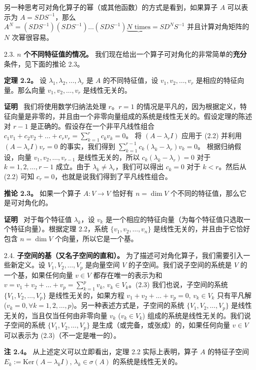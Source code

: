 另一种思考可对角化算子的幂（或其他函数）的方式是看到，如果算子 $A$ 可以表示为 $A = SDS^{-1}$，那么
$A^N = (SDS^{-1})(SDS^{-1})\dots(SDS^{-1}) \underbrace{N \text{ times}} = SD^N S^{-1}$
并且计算对角矩阵的 $N$ 次幂很容易。

2.3. \textbf{$n$ 个不同特征值的情况。} 我们现在给出一个算子可对角化的非常简单的\textbf{充分}条件，见下面的推论 2.3。

\textbf{定理 2.2。} 设 $\lambda_1, \lambda_2, \dots, \lambda_r$ 是 $A$ 的不同特征值，设 $v_1, v_2, \dots, v_r$ 是相应的特征向量。那么向量 $v_1, v_2, \dots, v_r$ 是线性无关的。

\textbf{证明}~ 我们将使用数学归纳法处理 $r$。$r=1$ 的情况是平凡的，因为根据定义，特征向量是非零的，并且由一个非零向量组成的系统是线性无关的。假设定理的陈述对 $r-1$ 是正确的。假设存在一个非平凡线性组合
$c_1 v_1 + c_2 v_2 + \dots + c_r v_r = \sum_{k=1}^r c_k v_k = 0$。
将 $(A - \lambda_r I)$ 应用于 (2.2) 并利用 $(A - \lambda_r I)v_r = 0$ 的事实，我们得到
$\sum_{k=1}^{r-1} c_k (\lambda_k - \lambda_r) v_k = 0$。
根据归纳假设，向量 $v_1, v_2, \dots, v_{r-1}$ 是线性无关的，所以 $c_k(\lambda_k - \lambda_r) = 0$ 对于 $k=1, 2, \dots, r-1$ 成立。由于 $\lambda_k \neq \lambda_r$，我们可以得出 $c_k = 0$ 对于 $k < r$。然后从 (2.2) 可知 $c_r = 0$，也就是说我们得到了平凡线性组合。

\textbf{推论 2.3。} 如果一个算子 $A: V \to V$ 恰好有 $n = \dim V$ 个不同的特征值，那么它是可对角化的。

\textbf{证明}~ 对于每个特征值 $\lambda_k$，设 $v_k$ 是一个相应的特征向量（为每个特征值只选取一个特征向量）。根据定理 2.2，系统 $\{v_1, v_2, \dots, v_n\}$ 是线性无关的，并且由于它恰好包含 $n = \dim V$ 个向量，所以它是一个基。



2.4. \textbf{子空间的基（又名子空间的直和）。} 为了描述可对角化算子，我们需要引入一些新定义。设 $V_1, V_2, \dots, V_p$ 是向量空间 $V$ 的子空间。我们说子空间的系统是 $V$ 的一个基，如果任何向量 $v \in V$ 都存在唯一的表示为和
$v = v_1 + v_2 + \dots + v_p = \sum_{k=1}^p v_k$, $v_k \in V_k$。(2.3)
我们也说，子空间的系统 $\{V_1, V_2, \dots, V_p\}$ 是线性无关的，如果方程 $v_1 + v_2 + \dots + v_p = 0$, $v_k \in V_k$ 只有平凡解 ($v_k = 0, \forall k = 1, 2, \dots, p$)。另一种表述方式是，子空间的系统 $\{V_1, V_2, \dots, V_p\}$ 是线性无关的，当且仅当任何由非零向量 $v_k$ ($v_k \in V_k$) 组成的系统是线性无关的。我们说子空间的系统 $\{V_1, V_2, \dots, V_p\}$ 是生成（或完备，或张成）的，如果任何向量 $v \in V$ 可以表示为 (2.3)（不一定是唯一的）。

\textbf{注 2.4。} 从上述定义可以立即看出，定理 2.2 实际上表明，算子 $A$ 的特征子空间 $E_k := \text{Ker}(A - \lambda_k I)$, $\lambda_k \in \sigma(A)$ 的系统是线性无关的。

